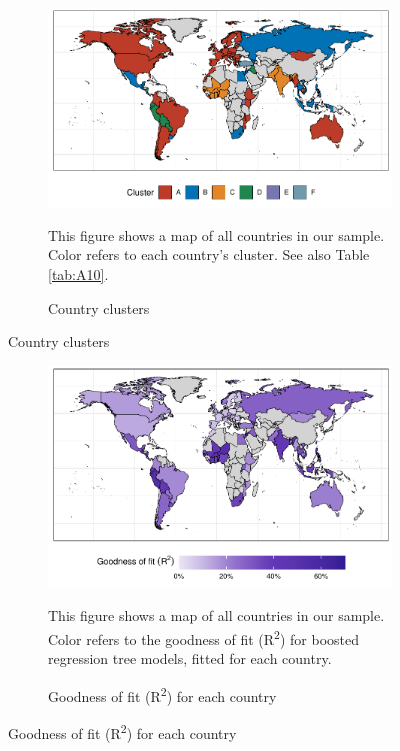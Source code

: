 \begin{figure}[ht!]
  \centering
  \caption{Overview of countries} \label{fig:Map}
  \begin{subfigure}[b]{\textwidth}
  \centering
  \includegraphics{1_Figures/Figures_Appendix/Figure_Maps_1.pdf}
  \caption{Country clusters} \label{fig:Map_1}
  \begin{subcaption2}
    This figure shows a map of all countries in our sample. Color refers to each country's cluster. See also Table \ref{tab:A10}.
  \end{subcaption2}
  \end{subfigure}
\end{figure}

\begin{figure}[ht!]\ContinuedFloat
   \begin{subfigure}[b]{\textwidth}
  \centering
  \includegraphics{1_Figures/Figures_Appendix/Figure_Maps_2.pdf}
  \caption{Goodness of fit (R\textsuperscript{2}) for each country} \label{fig:Map_2}
  \begin{subcaption2}
    This figure shows a map of all countries in our sample. Color refers to the goodness of fit (R\textsuperscript{2}) for boosted regression tree models, fitted for each country.
  \end{subcaption2}
\end{subfigure}
\end{figure}

